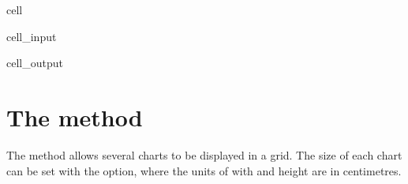 \documentclass[letterpaper,10pt,english]{jupyterBook}
\begin{document}
\begin{sphinxuseclass}{cell}\begin{sphinxVerbatimInput}

\begin{sphinxuseclass}{cell_input}
\begin{sphinxVerbatim}[commandchars=\\\{\}]
 
\end{sphinxVerbatim}

\end{sphinxuseclass}\end{sphinxVerbatimInput}
\begin{sphinxVerbatimOutput}

\begin{sphinxuseclass}{cell_output}
\noindent{}

\noindent{}

\end{sphinxuseclass}\end{sphinxVerbatimOutput}

\end{sphinxuseclass}

\section{The  method}
\label{\detokenize{content/05_WBModels/ScenarioAnalysis:the-keep-plot-multi-method}}
\sphinxAtStartPar
The  method allows several charts to be displayed in a grid.  The size of each chart can be set with the  option, where the units of with and height are in centimetres.
\end{document}
